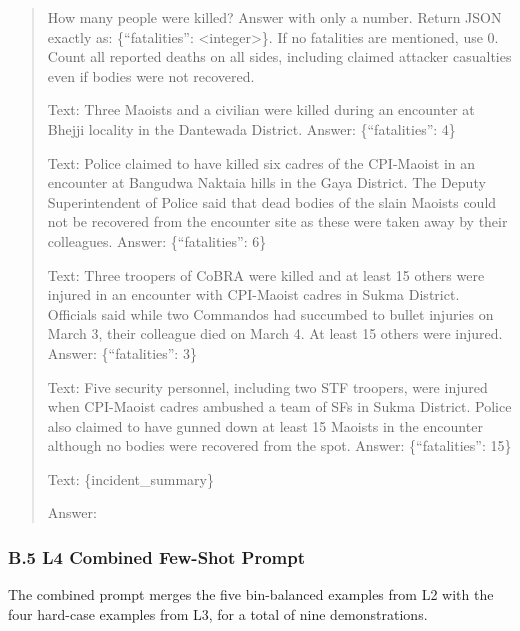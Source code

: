 \documentclass[
  11pt,
]{article}
\begin{document}
\begin{quote}
How many people were killed? Answer with only a number. Return JSON
exactly as: \{``fatalities'': \textless integer\textgreater\}. If no
fatalities are mentioned, use 0. Count all reported deaths on all sides,
including claimed attacker casualties even if bodies were not recovered.

Text: Three Maoists and a civilian were killed during an encounter at
Bhejji locality in the Dantewada District. Answer: \{``fatalities'': 4\}

Text: Police claimed to have killed six cadres of the CPI-Maoist in an
encounter at Bangudwa Naktaia hills in the Gaya District. The Deputy
Superintendent of Police said that dead bodies of the slain Maoists
could not be recovered from the encounter site as these were taken away
by their colleagues. Answer: \{``fatalities'': 6\}

Text: Three troopers of CoBRA were killed and at least 15 others were
injured in an encounter with CPI-Maoist cadres in Sukma District.
Officials said while two Commandos had succumbed to bullet injuries on
March 3, their colleague died on March 4. At least 15 others were
injured. Answer: \{``fatalities'': 3\}

Text: Five security personnel, including two STF troopers, were injured
when CPI-Maoist cadres ambushed a team of SFs in Sukma District. Police
also claimed to have gunned down at least 15 Maoists in the encounter
although no bodies were recovered from the spot. Answer:
\{``fatalities'': 15\}

Text: \{incident\_summary\}

Answer:
\end{quote}

\subsubsection{B.5 L4 Combined Few-Shot
Prompt}\label{b.5-l4-combined-few-shot-prompt}

The combined prompt merges the five bin-balanced examples from L2 with
the four hard-case examples from L3, for a total of nine demonstrations.
\end{document}
